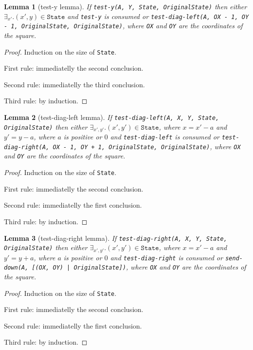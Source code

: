 \documentclass[9pt]{article}
\newtheorem{lemma}{Lemma}
\begin{document}
\begin{lemma}[test-y lemma]
If \texttt{test-y(A, Y, State, OriginalState)} then either $\exists_{x'}. {(x', y) \in \mathtt{State}}$ and \texttt{test-y} is consumed or \texttt{test-diag-left(A, OX - 1, OY - 1, OriginalState, OriginalState)}, where \texttt{OX} and \texttt{OY} are the coordinates of the square.
\end{lemma}
\begin{proof}
Induction on the size of \texttt{State}.

First rule: immediatelly the second conclusion.

Second rule: immediatelly the third conclusion.

Third rule: by induction.
\end{proof}

\begin{lemma}[test-diag-left lemma]
If \texttt{test-diag-left(A, X, Y, State, OriginalState)} then either $\exists_{x', y'}. {(x', y') \in \mathtt{State}}$, where $x = x' - a$ and $y' = y - a$, where $a$ is positive or $0$ and \texttt{test-diag-left} is consumed or \texttt{test-diag-right(A, OX - 1, OY + 1, OriginalState, OriginalState)}, where \texttt{OX} and \texttt{OY} are the coordinates of the square.
\end{lemma}
\begin{proof}
Induction on the size of \texttt{State}.

First rule: immediatelly the second conclusion.

Second rule: immediatelly the first conclusion.

Third rule: by induction.
\end{proof}

\begin{lemma}[test-diag-right lemma]
If \texttt{test-diag-right(A, X, Y, State, OriginalState)} then either $\exists_{x', y'}. {(x', y') \in \mathtt{State}}$, where $x = x' - a$ and $y' = y + a$, where $a$ is positive or $0$ and \texttt{test-diag-right} is consumed or \texttt{send-down(A, [(OX, OY) | OriginalState])}, where \texttt{OX} and \texttt{OY} are the coordinates of the square.
\end{lemma}
\begin{proof}
Induction on the size of \texttt{State}.

First rule: immediatelly the second conclusion.

Second rule: immediatelly the first conclusion.

Third rule: by induction.
\end{proof}
\end{document}
